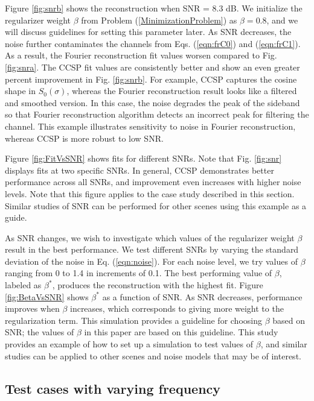 \documentclass[10pt]{article}
\numberwithin{equation}{subsection}
\begin{document}
    Figure \ref{fig:snrb} shows the reconstruction when SNR = 8.3 dB.
    We initialize the regularizer weight $\beta$ from Problem (\ref{MinimizationProblem}) as $\beta = 0.8$, and we will discuss guidelines for setting this parameter later.
    As SNR decreases, the noise further contaminates the channels from Eqs. (\ref{eqn:frC0}) and (\ref{eqn:frC1}).
    As a result, the Fourier reconstruction fit values worsen compared to Fig. \ref{fig:snra}.
    The CCSP fit values are consistently better and show an even greater percent improvement in Fig. \ref{fig:snrb}.
    For example, CCSP captures the cosine shape in $S_0(\sigma)$, whereas the Fourier reconstruction result looks like a filtered and smoothed version.
    In this case, the noise degrades the peak of the sideband so that Fourier reconstruction algorithm detects an incorrect peak for filtering the channel.
    This example illustrates sensitivity to noise in Fourier reconstruction, whereas CCSP is more robust to low SNR.

    Figure \ref{fig:FitVsSNR} shows fits for different SNRs.
    Note that Fig. \ref{fig:snr} displays fits at two specific SNRs.
    In general, CCSP demonstrates better performance across all SNRs, and improvement even increases with higher noise levels.
    Note that this figure applies to the case study described in this section.
    Similar studies of SNR can be performed for other scenes using this example as a guide.

    As SNR changes, we wish to investigate which values of the regularizer weight $\beta$ result in the best performance.
    We test different SNRs by varying the standard deviation of the noise in Eq. (\ref{eqn:noise}).
    For each noise level, we try values of $\beta$ ranging from 0 to 1.4 in increments of 0.1.
    The best performing value of $\beta$, labeled as $\beta^\ast$, produces the reconstruction with the highest fit.
    Figure \ref{fig:BetaVsSNR} shows $\beta^\ast$ as a function of SNR.
    As SNR decreases, performance improves when $\beta$ increases, which corresponds to giving more weight to the regularization term.
    This simulation provides a guideline for choosing $\beta$ based on SNR; the values of $\beta$ in this paper are based on this guideline.
    This study provides an example of how to set up a simulation to test values of $\beta$, and similar studies can be applied to other scenes and noise models that may be of interest.

\subsection{Test cases with varying frequency}\label{SectionVaryFrequency}
\end{document}
